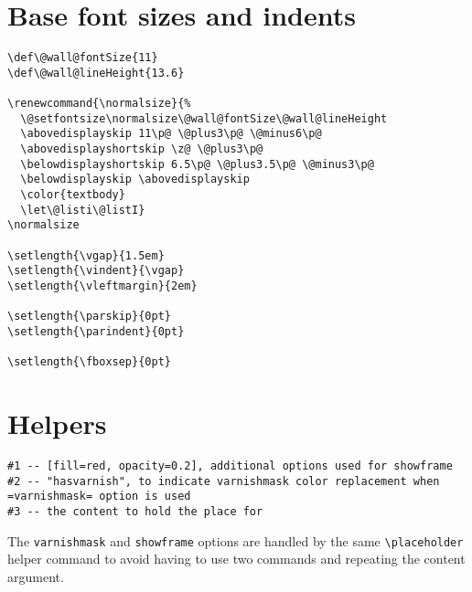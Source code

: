 \documentclass[11pt,oneside]{memoir-article}
\begin{document}
\section{Base font sizes and indents}
\label{sec:org8e11363}

\begin{verbatim}
\def\@wall@fontSize{11}
\def\@wall@lineHeight{13.6}

\renewcommand{\normalsize}{%
  \@setfontsize\normalsize\@wall@fontSize\@wall@lineHeight
  \abovedisplayskip 11\p@ \@plus3\p@ \@minus6\p@
  \abovedisplayshortskip \z@ \@plus3\p@
  \belowdisplayshortskip 6.5\p@ \@plus3.5\p@ \@minus3\p@
  \belowdisplayskip \abovedisplayskip
  \color{textbody}
  \let\@listi\@listI}
\normalsize

\setlength{\vgap}{1.5em}
\setlength{\vindent}{\vgap}
\setlength{\vleftmargin}{2em}

\setlength{\parskip}{0pt}
\setlength{\parindent}{0pt}

\setlength{\fboxsep}{0pt}
\end{verbatim}

\section{Helpers}
\label{sec:orgc657823}

\begin{verbatim}
#1 -- [fill=red, opacity=0.2], additional options used for showframe
#2 -- "hasvarnish", to indicate varnishmask color replacement when =varnishmask= option is used
#3 -- the content to hold the place for
\end{verbatim}

The \texttt{varnishmask} and \texttt{showframe} options are handled by the same \texttt{\textbackslash{}placeholder}
helper command to avoid having to use two commands and repeating the content
argument.
\end{document}
